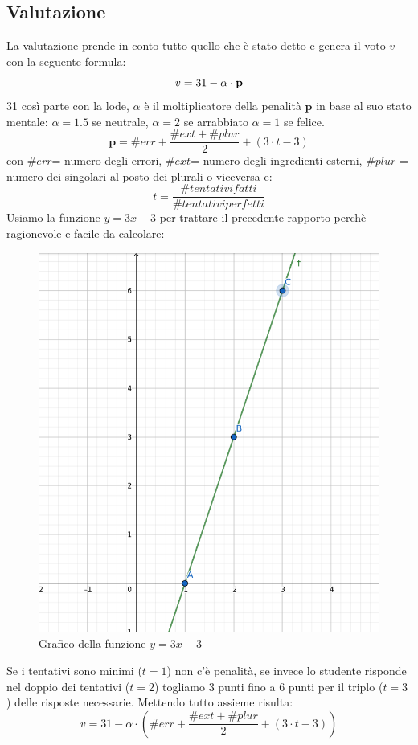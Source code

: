 \subsection{Valutazione}
La valutazione prende in conto tutto quello che è stato detto e genera il voto $v$ con la seguente formula:
\[
v = 31 - \alpha \cdot \textbf{p} \\
\]
31 così parte con la lode, $\alpha$ è il moltiplicatore della penalità $\textbf{p}$ in base al suo stato mentale: $\alpha = 1.5$ se neutrale, $\alpha=2$ se arrabbiato $\alpha = 1$ se felice.
\[
\textbf{p} = \#err + \frac{\#ext + \#plur}{2} + (3\cdot t - 3)
\]
con $\#err$= numero degli errori, $\#ext$= numero degli ingredienti esterni, $\#plur$ = numero dei singolari al posto dei plurali o viceversa e:
\[
t = \frac{\#tentativi fatti}{\# tentativi perfetti}
\]
\newpage
Usiamo la funzione $y = 3x -3$ per trattare il precedente rapporto perchè ragionevole e facile da calcolare:
\begin{figure}[h]
\centerline{\includegraphics[scale=0.25]{Images/3x-3.png}}
\caption{Grafico della funzione $y = 3x -3$}
\label{fig:FunzioneVoto}
\end{figure}

Se i tentativi sono minimi ($t=1$) non c'è penalità, se invece lo studente risponde nel doppio dei tentativi ($t=2$) togliamo 3 punti fino a 6 punti per il triplo ($t=3$) delle risposte necessarie.
\newline
Mettendo tutto assieme risulta:
\[
v = 31 - \alpha \cdot (\#err + \frac{\#ext + \#plur}{2} + (3\cdot t - 3))
\]
